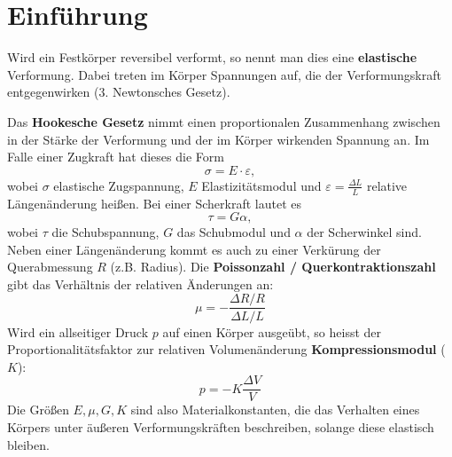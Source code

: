 \section{Einführung}
Wird ein Festkörper reversibel verformt, so nennt man dies eine \textbf{elastische} Verformung.
Dabei treten im Körper Spannungen auf, die der Verformungskraft entgegenwirken (3. Newtonsches Gesetz).

Das \textbf{Hookesche Gesetz} nimmt einen proportionalen Zusammenhang zwischen in der Stärke der Verformung und der im Körper wirkenden Spannung an.
Im Falle einer Zugkraft hat dieses die Form
\begin{equation}
  \sigma = E\cdot \varepsilon,
  \label{eq:hookzug}
\end{equation}
wobei $\sigma$ elastische Zugspannung, $E$ Elastizitätsmodul und $\varepsilon=\frac{\Delta L}{L}$ relative Längenänderung heißen.
Bei einer Scherkraft lautet es
\begin{equation}
  \tau = G\alpha,
  \label{eq:hookscher}
\end{equation}
wobei $\tau$ die Schubspannung, $G$ das Schubmodul und $\alpha$ der Scherwinkel sind. \\

Neben einer Längenänderung kommt es auch zu einer Verkürung der Querabmessung $R$ (z.B. Radius). Die \textbf{Poissonzahl / Querkontraktionszahl} gibt das Verhältnis der relativen Änderungen an:
\begin{equation}
  \mu=-\frac{\Delta R/R}{\Delta L/L}
  \label{eq:poisson}
\end{equation}
Wird ein allseitiger Druck $p$ auf einen Körper ausgeübt, so heisst der Proportionalitätsfaktor zur relativen Volumenänderung \textbf{Kompressionsmodul} ($K$):
\begin{equation}
  p=-K \frac{\Delta V}{V}
  \label{eq:kompression}
\end{equation}
Die Größen $E, \mu, G, K$ sind also Materialkonstanten, die das Verhalten eines Körpers unter äußeren Verformungskräften beschreiben, solange diese elastisch bleiben. \\

